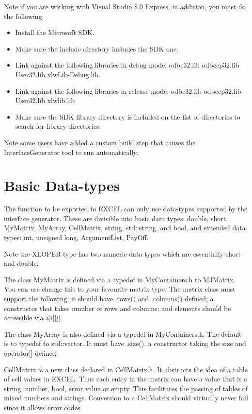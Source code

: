 \documentclass[12pt,reqno]{amsart}
\numberwithin{equation}{section}
\numberwithin{figure}{section}
\begin{document}
Note if you are working with Visual Studio 8.0 Express, in addition, you must do
the following:   
\begin{itemize}
\item Install the Microsoft SDK.
\item Make sure the include directory includes the SDK one.
\item Link against the following libraries in debug mode: odbc32.lib
  odbccp32.lib User32.lib xlwLib-Debug.lib.
\item Link against the following libraries in release mode: odbc32.lib 
odbccp32.lib User32.lib xlwlib.lib
\item Make sure the SDK library directory is included on the list of
  directories to search for library directories. 
\end{itemize}

Note some users have added a custom build step that causes the
InterfaceGenerator tool to run automatically. 

\section{Basic Data-types}

The function to be exported to EXCEL can only use data-types supported
by the interface generator. These are divisible into basic data types: double, short,
MyMatrix, MyArray, CellMatrix, string, std::string, and bool, and
extended data types: int, unsigned long, ArgumentList, PayOff. 

Note the XLOPER type has two numeric data types which are essentially
short and double.

The class MyMatrix is defined via a typedef in MyContainers.h to
MJMatrix. You can use change this to your favourite matrix type. The
matrix class must support the following: it should have .rows()
and .columns() defined; a constructor that takes number of rows and
columns; and elements should be accessible via a[i][j]. 

The class MyArray is also defined via a typedef in MyContainers.h. The
default is to typedef to std::vector. It must have .size(), a
constructor taking the size and operator[] defined. 

CellMatrix is a new class declared in CellMatrix.h. It abstracts the
idea of a table of cell values in EXCEL. Thus each entry in the matrix
can have a value that is a string, number, bool, error value or
empty. This facilitates the passing of tables of mixed numbers and
strings. Conversion to a CellMatrix should virtually never fail since
it allows error codes. 
\end{document}
